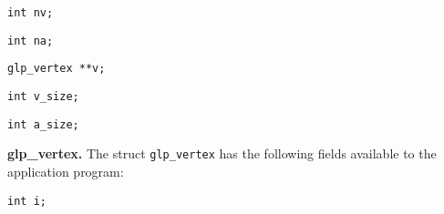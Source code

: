 \documentclass[dvipdfm,11pt]{report}
\begin{document}
\medskip

\noindent
\verb|int nv;|

\begin{comment}The number of vertices in the graph, $nv\geq 0$.
\end{comment}

\medskip

\noindent
\verb|int na;|

\begin{comment}The number of arcs in the graph, $na\geq 0$.
\end{comment}

\medskip

\noindent
\verb|glp_vertex **v;|

\begin{comment}Pointer to an array containing the list of vertices.
Element $v[0]$ is not used. Element $v[i]$, $1\leq i\leq nv$, is a
pointer to $i$-th vertex of the graph. Note that on adding new vertices
to the graph the field $v$ may be altered due to reallocation. However,
pointers $v[i]$ are not changed while corresponding vertices exist in
the graph.
\end{comment}

\medskip

\noindent
\verb|int v_size;|

\begin{comment}Size of vertex data blocks, in bytes,
$0\leq v\_size\leq 256$. (See also the field \verb|data| in the struct
\verb|glp_vertex|.)
\end{comment}

\medskip

\noindent
\verb|int a_size;|

\begin{comment}Size of arc data blocks, in bytes,
$0\leq v\_size\leq 256$. (See also the field \verb|data| in the struct
\verb|glp_arc|.)
\end{comment}

\bigskip

\noindent
{\bf glp\_vertex.} The struct \verb|glp_vertex| has the following
fields available to the application program:

\medskip

\noindent
\verb|int i;|

\begin{comment}Ordinal number of the vertex, $1\leq i\leq nv$. Note
that element $v[i]$ in the struct \verb|glp_graph| points to the vertex,
whose ordinal number is $i$.
\end{comment}
\end{document}
